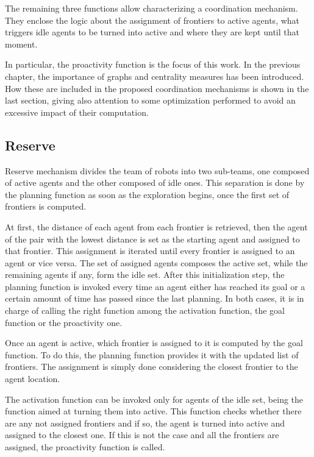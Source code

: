 The remaining three functions allow characterizing a coordination
mechanism. They enclose the logic about the assignment of frontiers
to active agents, what triggers idle agents to be turned into active
and where they are kept until that moment.

In particular, the proactivity function is the focus of this work.
In the previous chapter, the importance of graphs and centrality measures
has been introduced. How these are included in the proposed coordination
mechanisms is shown in the last section, giving also attention to
some optimization performed to avoid an excessive impact of their
computation. 

\subsection{Reserve}

Reserve mechanism divides the team of robots into two sub-teams, one
composed of active agents and the other composed of idle ones. This
separation is done by the planning function as soon as the exploration
begins, once the first set of frontiers is computed. 

At first, the distance of each agent from each frontier is retrieved,
then the agent of the pair with the lowest distance is set as the
starting agent and assigned to that frontier. This assignment is iterated
until every frontier is assigned to an agent or vice versa. The set
of assigned agents composes the active set, while the remaining agents
if any, form the idle set. After this initialization step, the planning
function is invoked every time an agent either has reached its goal
or a certain amount of time has passed since the last planning. In
both cases, it is in charge of calling the right function among the
activation function, the goal function or the proactivity one.

Once an agent is active, which frontier is assigned to it is computed
by the goal function. To do this, the planning function provides it
with the updated list of frontiers. The assignment is simply done
considering the closest frontier to the agent location. 

The activation function can be invoked only for agents of the idle
set, being the function aimed at turning them into active. This function
checks whether there are any not assigned frontiers and if so, the
agent is turned into active and assigned to the closest one. If this
is not the case and all the frontiers are assigned, the proactivity
function is called. 

